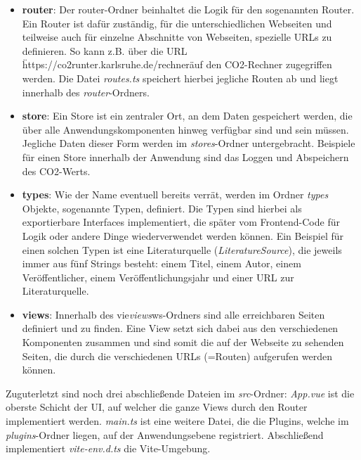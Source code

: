 \begin{itemize}
    \item \textbf{router}: Der router-Ordner beinhaltet die Logik für den sogenannten Router. Ein Router ist dafür zuständig, für die unterschiedlichen Webseiten und teilweise auch für einzelne Abschnitte von Webseiten, spezielle URLs zu definieren. So kann z.B. über die URL \"https://co2runter.karlsruhe.de/rechner\" auf den CO2-Rechner zugegriffen werden. Die Datei \textit{routes.ts} speichert hierbei jegliche Routen ab und liegt innerhalb des \textit{router}-Ordners.
    \item \textbf{store}: Ein Store ist ein zentraler Ort, an dem Daten gespeichert werden, die über alle Anwendungskomponenten hinweg verfügbar sind und sein müssen. Jegliche Daten dieser Form werden im \textit{stores}-Ordner untergebracht. Beispiele für einen Store innerhalb der Anwendung sind das Loggen und Abspeichern des CO2-Werts.
    \item \textbf{types}: Wie der Name eventuell bereits verrät, werden im Ordner \textit{types} Objekte, sogenannte Typen, definiert. Die Typen sind hierbei als exportierbare Interfaces implementiert, die später vom Frontend-Code für Logik oder andere Dinge wiederverwendet werden können. Ein Beispiel für einen solchen Typen ist eine Literaturquelle (\textit{LiteratureSource}), die jeweils immer aus fünf Strings besteht: einem Titel, einem Autor, einem Veröffentlicher, einem Veröffentlichungsjahr und einer URL zur Literaturquelle.
    \item \textbf{views}: Innerhalb des vie\textit{views}ws-Ordners sind alle erreichbaren Seiten definiert und zu finden. Eine View setzt sich dabei aus den verschiedenen Komponenten zusammen und sind somit die auf der Webseite zu sehenden Seiten, die durch die verschiedenen URLs (=Routen) aufgerufen werden können.
\end{itemize}

Zuguterletzt sind noch drei abschließende Dateien im \textit{src}-Ordner: \textit{App.vue} ist die oberste Schicht der UI, auf welcher die ganze Views durch den Router implementiert werden. \textit{main.ts} ist eine weitere Datei, die die Plugins, welche im \textit{plugins}-Ordner liegen, auf der Anwendungsebene registriert. Abschließend implementiert \textit{vite-env.d.ts} die Vite-Umgebung.

